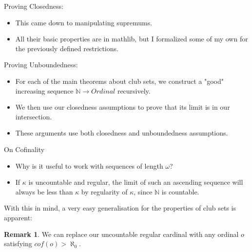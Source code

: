 \documentclass{beamer}
\theoremstyle{definition}
\newtheorem{rem}[subsection]{Remark}
\begin{document}
\begin{frame}{Proving Closedness:}
    \begin{itemize}
        \item[] This came down to manipulating supremums. \pause
        \item[] All their basic properties are in mathlib, but I formalized some of my own for the previously defined restrictions.
    \end{itemize}
\end{frame}

\begin{frame}{Proving Unboundedness:}
    \begin{itemize}
        \item[] For each of the main theorems about club sets, we construct a "good" increasing sequence $\mathbb{N}\to Ordinal$ recursively. \pause
        \item[] We then use our closedness assumptions to prove that its limit is in our intersection.
        \item[] These arguments use both closedness and unboundedness assumptions.
    \end{itemize}
\end{frame}

\begin{frame}{On Cofinality}
    \begin{itemize}
        \item[] Why is it useful to work with sequences of length $\omega$? \pause
        \item[] If $\kappa$ is uncountable and regular, the limit of such an ascending sequence will always be less than $\kappa$ by regularity of $\kappa$, since $\mathbb{N}$ is countable.
    \end{itemize} \pause
    \par With this in mind, a very easy generalisation for the properties of club sets is apparent:
    \begin{rem}
        We can replace our uncountable regular cardinal with any ordinal $o$ satisfying $cof(o)>\aleph_0$.
    \end{rem}
\end{frame}
\end{document}

